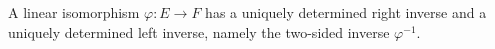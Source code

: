 A linear isomorphism $\varphi: E \to F$ has a uniquely determined right inverse and a uniquely determined left inverse, namely the two-sided inverse $\varphi^{-1}$.

